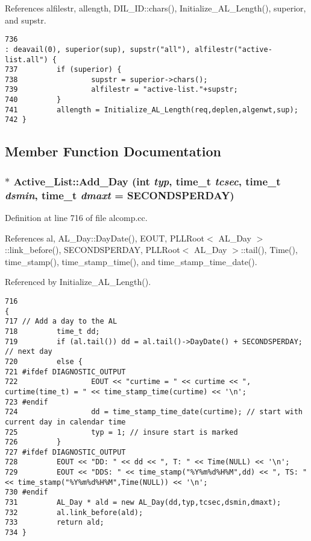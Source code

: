 References alfilestr, allength, DIL\_\-ID::chars(), Initialize\_\-AL\_\-Length(), superior, and supstr.



\footnotesize\begin{verbatim}736                                                                                     : deavail(0), superior(sup), supstr("all"), alfilestr("active-list.all") {
737         if (superior) {
738                 supstr = superior->chars();
739                 alfilestr = "active-list."+supstr;
740         }
741         allength = Initialize_AL_Length(req,deplen,algenwt,sup);
742 }
\end{verbatim}\normalsize 


\subsection{Member Function Documentation}
\subsubsection{ $\ast$ Active\_\-List::Add\_\-Day (int {\em typ}, time\_\-t {\em tcsec}, time\_\-t {\em dsmin}, time\_\-t {\em dmaxt} = SECONDSPERDAY)}\label{classActive__List_a4}




Definition at line 716 of file alcomp.cc.

References al, AL\_\-Day::Day\-Date(), EOUT, PLLRoot$<$ AL\_\-Day $>$::link\_\-before(), SECONDSPERDAY, PLLRoot$<$ AL\_\-Day $>$::tail(), Time(), time\_\-stamp(), time\_\-stamp\_\-time(), and time\_\-stamp\_\-time\_\-date().

Referenced by Initialize\_\-AL\_\-Length().



\footnotesize\begin{verbatim}716                                                                                                {
717 // Add a day to the AL
718         time_t dd;
719         if (al.tail()) dd = al.tail()->DayDate() + SECONDSPERDAY; // next day
720         else {
721 #ifdef DIAGNOSTIC_OUTPUT
722                 EOUT << "curtime = " << curtime << ", curtime(time_t) = " << time_stamp_time(curtime) << '\n';
723 #endif
724                 dd = time_stamp_time_date(curtime); // start with current day in calendar time
725                 typ = 1; // insure start is marked
726         }
727 #ifdef DIAGNOSTIC_OUTPUT
728         EOUT << "DD: " << dd << ", T: " << Time(NULL) << '\n';
729         EOUT << "DDS: " << time_stamp("%Y%m%d%H%M",dd) << ", TS: " << time_stamp("%Y%m%d%H%M",Time(NULL)) << '\n';
730 #endif
731         AL_Day * ald = new AL_Day(dd,typ,tcsec,dsmin,dmaxt);
732         al.link_before(ald);
733         return ald;
734 }
\end{verbatim}\normalsize 
{}
